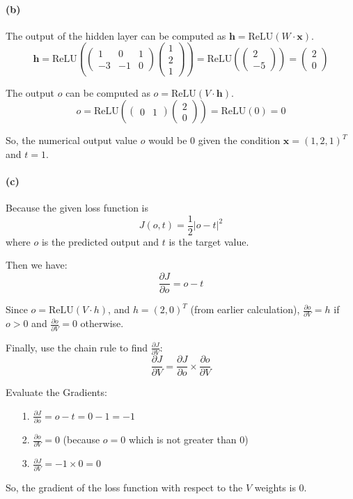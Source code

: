 \paragraph*{(b)}

The output of the hidden layer can be computed as \( \mathbf{h} = \text{ReLU}(W \cdot \mathbf{x}) \).
    \[
    \mathbf{h} = \text{ReLU}\left(\begin{pmatrix} 1 & 0 & 1 \\ -3 & -1 & 0 \end{pmatrix} \begin{pmatrix} 1 \\ 2 \\ 1 \end{pmatrix}\right)
    = \text{ReLU}\left(\begin{pmatrix} 2 \\ -5 \end{pmatrix}\right)
    = \begin{pmatrix} 2 \\ 0 \end{pmatrix}
    \]

The output \( o \) can be computed as \( o = \text{ReLU}(V \cdot \mathbf{h}) \).  
    \[
    o = \text{ReLU}\left(\begin{pmatrix} 0 & 1 \end{pmatrix} \begin{pmatrix} 2 \\ 0 \end{pmatrix}\right)
    = \text{ReLU}(0)
    = 0
    \]

So, the numerical output value \( o \) would be 0 given the condition \( \mathbf{x} = (1, 2, 1)^T \) and \( t = 1 \).

\paragraph*{(c)}

Because the given loss function is 
\[
J(o, t) = \frac{1}{2} |o - t|^2
\]
where \( o \) is the predicted output and \( t \) is the target value.

Then we have:
\[
\frac{\partial J}{\partial o} = o - t
\]

Since \( o = \text{ReLU}(V \cdot h) \), and \( h = (2, 0)^T \) (from earlier calculation), \( \frac{\partial o}{\partial V} = h \) if \( o > 0 \) and \( \frac{\partial o}{\partial V} = 0 \) otherwise.

Finally, use the chain rule to find \( \frac{\partial J}{\partial V} \):
\[
\frac{\partial J}{\partial V} = \frac{\partial J}{\partial o} \times \frac{\partial o}{\partial V}
\]

Evaluate the Gradients:

\begin{itemize}
    \item[1.] \( \frac{\partial J}{\partial o} = o - t = 0 - 1 = -1 \)
    \item[2.] \( \frac{\partial o}{\partial V} = 0 \) (because \( o = 0 \) which is not greater than 0)
    \item[3.] \( \frac{\partial J}{\partial V} = -1 \times 0 = 0 \)
\end{itemize}

So, the gradient of the loss function with respect to the \( V \) weights is 0.
